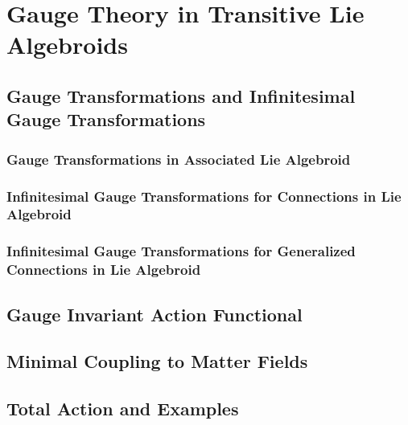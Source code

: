 \documentclass[12pt]{report}
\theoremstyle{definition}
\begin{document}
\chapter{Gauge Theory in Transitive Lie Algebroids}\label{chp:gaugeTh}


\section{Gauge Transformations and Infinitesimal Gauge Transformations}

\subsection{Gauge Transformations in Associated Lie Algebroid}

\subsection{Infinitesimal Gauge Transformations for Connections in Lie Algebroid}

\subsection{Infinitesimal Gauge Transformations for Generalized Connections in Lie Algebroid}

\section{Gauge Invariant Action Functional}

\section{Minimal Coupling to Matter Fields}

\section{Total Action and Examples}

\printbibliography
\end{document}
